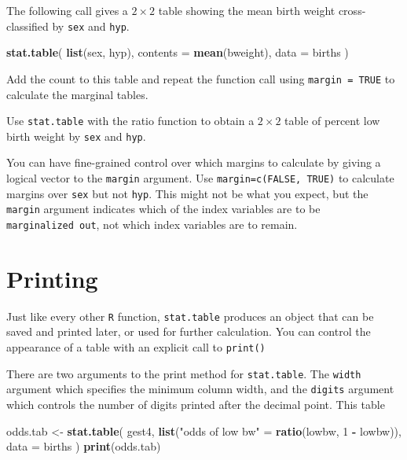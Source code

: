 \documentclass[
]{book}
\newenvironment{Shaded}{\begin{snugshade}}{\end{snugshade}}
\newcommand{\AttributeTok}[1]{\textcolor[rgb]{0.13,0.29,0.53}{#1}}
\newcommand{\DecValTok}[1]{\textcolor[rgb]{0.00,0.00,0.81}{#1}}
\newcommand{\FunctionTok}[1]{\textcolor[rgb]{0.13,0.29,0.53}{\textbf{#1}}}
\newcommand{\NormalTok}[1]{#1}
\newcommand{\OtherTok}[1]{\textcolor[rgb]{0.56,0.35,0.01}{#1}}
\newcommand{\SpecialCharTok}[1]{\textcolor[rgb]{0.81,0.36,0.00}{\textbf{#1}}}
\newcommand{\StringTok}[1]{\textcolor[rgb]{0.31,0.60,0.02}{#1}}
\begin{document}
The following call gives a \(2\times 2\) table showing the mean birth weight
cross-classified by \texttt{sex} and \texttt{hyp}.

\begin{Shaded}
\begin{Highlighting}[]
\FunctionTok{stat.table}\NormalTok{(}
  \FunctionTok{list}\NormalTok{(sex, hyp), }
  \AttributeTok{contents =} \FunctionTok{mean}\NormalTok{(bweight), }
  \AttributeTok{data =}\NormalTok{ births}
\NormalTok{)}
\end{Highlighting}
\end{Shaded}

Add the count to this table and repeat the function call using \texttt{margin\ =\ TRUE} to calculate the
marginal tables.

Use \texttt{stat.table} with the ratio function to obtain a \(2\times 2\) table of percent low birth weight by \texttt{sex} and \texttt{hyp}.

You can have fine-grained control over which margins to calculate by
giving a logical vector to the \texttt{margin} argument. Use \texttt{margin=c(FALSE,\ TRUE)}
to calculate margins over \texttt{sex} but not
\texttt{hyp}. This might not be what you expect, but the \texttt{margin}
argument indicates which of the index variables are to be \texttt{marginalized\ out},
not which index variables are to remain.

\section{Printing}\label{printing}

Just like every other \texttt{R} function, \texttt{stat.table} produces
an object that can be saved and printed later, or used for further
calculation. You can control the appearance of a table with an explicit
call to \texttt{print()}

There are two arguments to the print method for \texttt{stat.table}. The
\texttt{width} argument which specifies the minimum column width, and the
\texttt{digits} argument which controls
the number of digits printed after the decimal point. This table

\begin{Shaded}
\begin{Highlighting}[]
\NormalTok{odds.tab }\OtherTok{\textless{}{-}} 
  \FunctionTok{stat.table}\NormalTok{(}
\NormalTok{    gest4, }
    \FunctionTok{list}\NormalTok{(}\StringTok{"odds of low bw"} \OtherTok{=} \FunctionTok{ratio}\NormalTok{(lowbw, }\DecValTok{1} \SpecialCharTok{{-}}\NormalTok{ lowbw)),}
    \AttributeTok{data =}\NormalTok{ births}
\NormalTok{)}
\FunctionTok{print}\NormalTok{(odds.tab)}
\end{Highlighting}
\end{Shaded}
\end{document}
